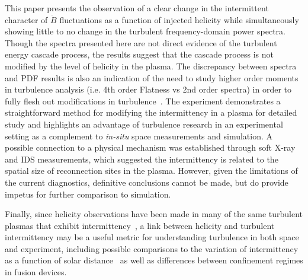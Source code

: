 \documentclass[aps,prl,amsmath,amssymb,reprint,superscriptaddress]{revtex4-1} %
\begin{document}
This paper presents the observation of a clear change in the intermittent character of $\dot{B}$ fluctuations as a function of injected helicity while simultaneously showing little to no change in the turbulent frequency-domain power spectra. Though the spectra presented here are not direct evidence of the turbulent energy cascade process, the results suggest that the cascade process is not modified by the level of helicity in the plasma. The discrepancy between spectra and PDF results is also an indication of the need to study higher order moments in turbulence analysis (i.e. 4th order Flatness vs 2nd order spectra) in order to fully flesh out modifications in turbulence~\cite{matthaeusVelli11}. The experiment demonstrates a straightforward method for modifying the intermittency in a plasma for detailed study and highlights an advantage of turbulence research in an experimental setting as a complement to {\it in-situ} space measurements and simulation. A possible connection to a physical mechanism was established through soft X-ray and IDS measurements, which suggested the intermittency is related to the spatial size of reconnection sites in the plasma. However, given the limitations of the current diagnostics, definitive conclusions cannot be made, but do provide impetus for further comparison to simulation.

Finally, since helicity observations have been made in many of the same turbulent plasmas that exhibit intermittency~\cite{goldstein94, ji95, telloni12}, a link between helicity and turbulent intermittency may be a useful metric for understanding turbulence in both space and experiment, including possible comparisons to the variation of intermittency as a function of solar distance~\cite{greco12} as well as differences between confinement regimes in fusion devices.
\end{document}
